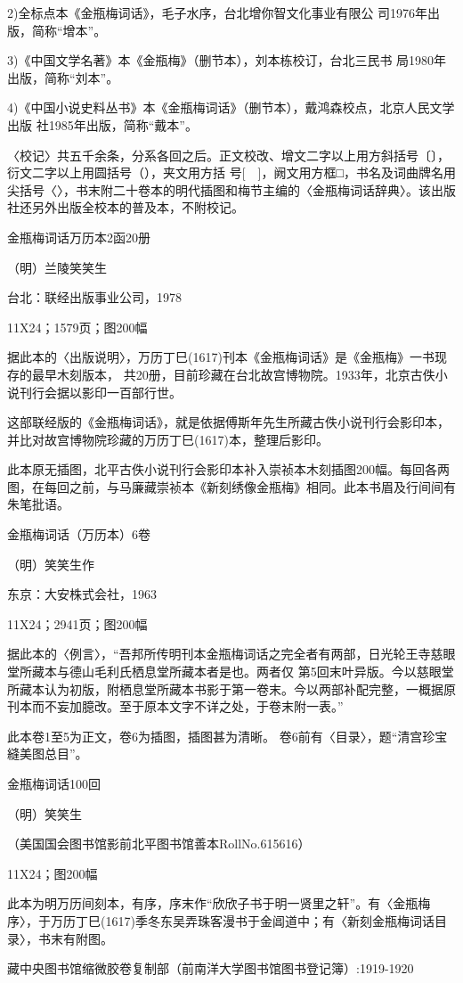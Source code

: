 2)全标点本《金瓶梅词话》，毛子水序，台北增你智文化事业有限公 司1976年出版，简称“增本”。

3)《中国文学名著》本《金瓶梅》（删节本），刘本栋校订，台北三民书 局1980年出版，简称“刘本”。

4)《中国小说史料丛书》本《金瓶梅词话》（删节本），戴鸿森校点，北京人民文学出版 社1985年出版，简称“戴本”。

〈校记〉共五千余条，分系各回之后。正文校改、增文二字以上用方斜括号〔〕，衍文二字以上用圆括号（），夹文用方括 号[　]，阙文用方框□，书名及词曲牌名用尖括号〈〉，书末附二十卷本的明代插图和梅节主编的〈金瓶梅词话辞典〉。该出版社还另外出版全校本的普及本，不附校记。





金瓶梅词话万历本2函20册

（明）兰陵笑笑生

台北：联经出版事业公司，1978

11X24；1579页；图200幅

据此本的〈出版说明〉，万历丁巳(1617)刊本《金瓶梅词话》是《金瓶梅》一书现存的最早木刻版本， 共20册，目前珍藏在台北故宫博物院。1933年，北京古佚小说刊行会据以影印一百部行世。

这部联经版的《金瓶梅词话》，就是依据傅斯年先生所藏古佚小说刊行会影印本，并比对故宫博物院珍藏的万历丁巳(1617)本，整理后影印。

此本原无插图，北平古佚小说刊行会影印本补入崇祯本木刻插图200幅。每回各两图，在每回之前，与马廉藏崇祯本《新刻绣像金瓶梅》相同。此本书眉及行间间有朱笔批语。




金瓶梅词话（万历本）6卷

（明）笑笑生作

东京：大安株式会社，1963

11X24；2941页；图200幅

据此本的〈例言〉，“吾邦所传明刊本金瓶梅词话之完全者有两部，日光轮王寺慈眼堂所藏本与德山毛利氏栖息堂所藏本者是也。两者仅 第5回末叶异版。今以慈眼堂所藏本认为初版，附栖息堂所藏本书影于第一卷末。今以两部补配完整，一概据原刊本而不妄加臆改。至于原本文字不详之处，于卷末附一表。”

此本卷1至5为正文，卷6为插图，插图甚为清晰。 卷6前有〈目录〉，题“清宫珍宝縫美图总目”。



金瓶梅词话100回

（明）笑笑生

（美国国会图书馆影前北平图书馆善本RollNo.615616）

11X24；图200幅

此本为明万历间刻本，有序，序末作“欣欣子书于明一贤里之轩”。有〈金瓶梅序〉，于万历丁巳(1617)季冬东吴弄珠客漫书于金阊道中；有〈新刻金瓶梅词话目录〉，书末有附图。

藏中央图书馆缩微胶卷复制部（前南洋大学图书馆图书登记簿）:1919-1920

